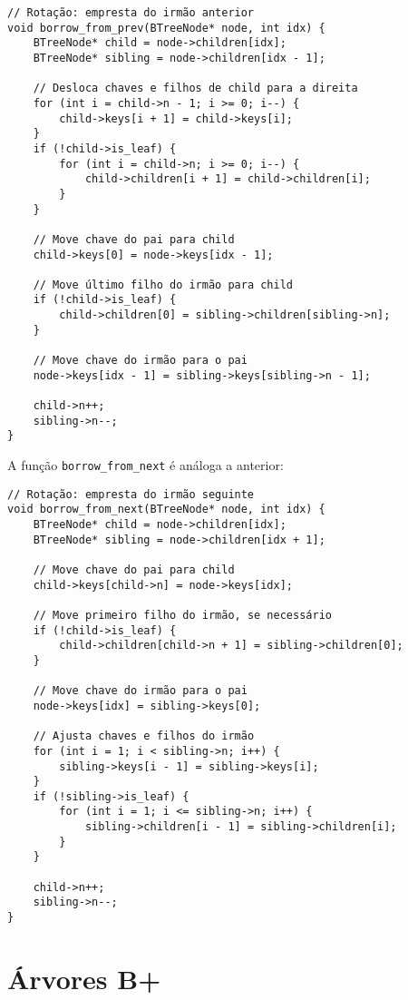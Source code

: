 \begin{lstlisting}
// Rotação: empresta do irmão anterior
void borrow_from_prev(BTreeNode* node, int idx) {
    BTreeNode* child = node->children[idx];
    BTreeNode* sibling = node->children[idx - 1];

    // Desloca chaves e filhos de child para a direita
    for (int i = child->n - 1; i >= 0; i--) {
        child->keys[i + 1] = child->keys[i];
    }
    if (!child->is_leaf) {
        for (int i = child->n; i >= 0; i--) {
            child->children[i + 1] = child->children[i];
        }
    }

    // Move chave do pai para child
    child->keys[0] = node->keys[idx - 1];

    // Move último filho do irmão para child
    if (!child->is_leaf) {
        child->children[0] = sibling->children[sibling->n];
    }

    // Move chave do irmão para o pai
    node->keys[idx - 1] = sibling->keys[sibling->n - 1];

    child->n++;
    sibling->n--;
}
\end{lstlisting}

A função {\tt borrow\_from\_next} é análoga a anterior:

\begin{lstlisting}
// Rotação: empresta do irmão seguinte
void borrow_from_next(BTreeNode* node, int idx) {
    BTreeNode* child = node->children[idx];
    BTreeNode* sibling = node->children[idx + 1];

    // Move chave do pai para child
    child->keys[child->n] = node->keys[idx];

    // Move primeiro filho do irmão, se necessário
    if (!child->is_leaf) {
        child->children[child->n + 1] = sibling->children[0];
    }

    // Move chave do irmão para o pai
    node->keys[idx] = sibling->keys[0];

    // Ajusta chaves e filhos do irmão
    for (int i = 1; i < sibling->n; i++) {
        sibling->keys[i - 1] = sibling->keys[i];
    }
    if (!sibling->is_leaf) {
        for (int i = 1; i <= sibling->n; i++) {
            sibling->children[i - 1] = sibling->children[i];
        }
    }

    child->n++;
    sibling->n--;
}
\end{lstlisting}

\section{Árvores B+}

